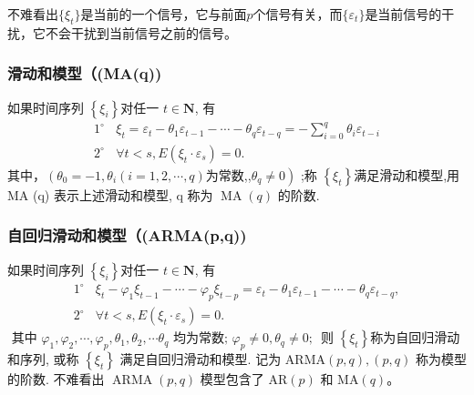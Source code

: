 		不难看出$\{\xi_t\}$是当前的一个信号，它与前面$p$个信号有关，而$\{\varepsilon_{t} \}$是当前信号的干扰，它不会干扰到当前信号之前的信号。
		
		
		
		\subsubsection{滑动和模型（(MA(q))}
		如果时间序列 $ \left\{\xi_{i}\right\}  $对任一 $ t \in \mathbf{N} $, 有
		\begin{gather}
		1^{\circ} ~~~~\xi_{t} =\varepsilon_{t}-\theta_{1} \varepsilon_{t-1}-\cdots-\theta_{q} \varepsilon_{t-q}=-\sum_{i=0}^{q} \theta_{i} \varepsilon_{t-i} 
 	\\
		2^{\circ} ~~~~ \forall  t<s  ,  E\left(\xi_{t} \cdot \varepsilon_{s}\right)=0 .
		\end{gather}
		其中，$\left(\theta_{0}=-1, \theta_{i}(i=1,2, \cdots, q)\right.  $为常数,,$ \left.\theta_{q} \neq 0\right)$ ;称 $  \left\{\xi_{t}\right\}  $满足滑动和模型,用 MA  (q)  表示上述滑动和模型,  q  称为  $\operatorname{MA}(q) $ 的阶数.
		\subsubsection{自回归滑动和模型（(ARMA(p,q))}
		如果时间序列 $ \left\{\xi_{i}\right\}  $对任一 $ t \in \mathbf{N} $, 有
		\begin{gather}
		1^{\circ} ~~~~ \xi_{t}-\varphi_{1} \xi_{t-1}-\cdots-\varphi_{p} \xi_{t-p} = \varepsilon_{t}-\theta_{1} \varepsilon_{t-1}-\cdots-\theta_{q} \varepsilon_{t-q},
	\\
		2^{\circ} ~~~~ \forall  t<s  ,  E\left(\xi_{t} \cdot \varepsilon_{s}\right)=0 .
		\end{gather}
		$\text { 其中 } \varphi_{1}, \varphi_{2}, \cdots, \varphi_{p}, \theta_{1}, \theta_{2}, \cdots \theta_{q} \text { 均为常数; } \varphi_{p} \neq 0, \theta_{q} \neq 0 \text {; }$
		则 $ \left\{\xi_{t}\right\}  $称为自回归滑动和序列, 或称 $ \left\{\xi_{t}\right\} $ 满足自回归滑动和模型. 记为  $\mathrm{ARMA}(p, q),(p, q) $ 称为模型的阶数.
		不难看出 $ \operatorname{ARMA}(p, q) \text { 模型包含了 } \mathrm{AR}(p) \text { 和 } \mathrm{MA}(q)$。
		
